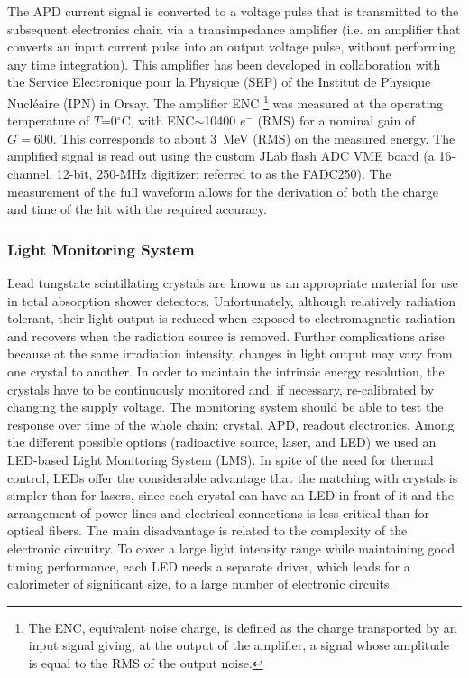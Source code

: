 The APD current signal is converted to a voltage pulse that is transmitted to the subsequent electronics chain via a
transimpedance amplifier (i.e. an amplifier that converts an input current pulse into an output voltage pulse, without
performing any time integration). This amplifier has been developed in collaboration with the Service Electronique
pour la Physique (SEP) of the Institut de Physique Nucl{\'e}aire (IPN) in Orsay. The amplifier ENC \footnote{The ENC,
  equivalent noise charge, is defined as the charge transported by an input signal giving, at the output of the amplifier,
  a signal whose amplitude is equal to the RMS of the output noise.} was measured at the operating temperature of
$T$=0$^\circ$C,  with ENC$\sim$10400 $e^-$ (RMS) for a nominal gain of $G=600$.  This corresponds to about
3~MeV (RMS) on the measured energy. The amplified signal is read out using the custom JLab flash
ADC VME board (a 16-channel, 12-bit, 250-MHz digitizer; referred to as the FADC250). The measurement
of the full waveform allows for the derivation of both the charge and time of the hit with the required  accuracy.

\subsubsection{Light Monitoring System}

Lead tungstate scintillating crystals are known as an appropriate material for use in total absorption shower
detectors. Unfortunately, although relatively radiation tolerant, their light output is reduced when exposed to
electromagnetic radiation and recovers when the radiation source is removed. Further complications arise because
at the same irradiation intensity, changes in light output may vary from one crystal to another. In order to maintain
the intrinsic energy resolution, the crystals have to be continuously monitored and, if necessary, re-calibrated by
changing the supply voltage. The monitoring system should be able to test the response over time of the whole
chain: crystal, APD, readout electronics. Among the different possible options (radioactive source, laser, and LED)
we used an LED-based Light Monitoring System (LMS). In spite of the need for thermal control, LEDs offer the
considerable advantage that the matching with crystals is simpler than for lasers, since each crystal can have an
LED in front of it and the arrangement of power lines and electrical connections is less critical than for optical
fibers. The main disadvantage is related to the complexity of the electronic circuitry. To cover a large light intensity
range while maintaining good timing performance, each LED needs a separate driver, which leads for a calorimeter of
significant size, to a large number of electronic circuits.

